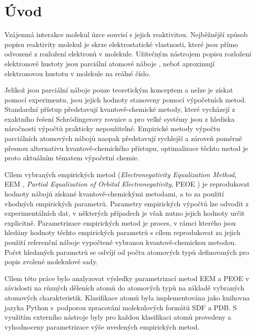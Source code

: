 \chapter{Úvod}
\setcounter{page}{1}
Vzájemná interakce molekul úzce souvisí s jejich reaktivitou.
Nejběžnější způsob popisu reaktivity molekul je skrze  elektrostatické vlastnosti, které jsou pří\-mo odvozené z rozložení elektronů v molekule. Užitečným nástrojem popisu rozložení elektronové hustoty jsou parciální atomové náboje \cite{Atkins}, neboť aproximují elektronovou hustotu v molekule na reálné číslo.

Jelikož jsou parciální náboje pouze teoretickým konceptem a nelze je získat pomocí experimentu, jsou jejich hodnoty stanoveny pomocí výpočetních metod. Standardní přístup představují kvantově-chemické metody, které vycházejí z exaktního řešení Schrödingerovy rovnice \cite{Volatron} a pro velké systémy jsou z hlediska náročnosti výpočtů prakticky nepoužitelné. Empirické metody výpočtu parciálních atomových nábojů naopak představují rychlejší a zároveň poměrně přesnou alternativu kvantově-chemické\-ho přístupu, optimalizace těchto metod je proto aktuálním tématem výpočetní chemie. 

Cílem vybraných empirických metod (\textit{Electronegativity Equalization Method}, EEM \cite{eem}, \textit{Partial Equalization of Orbital Electronegativity}, PEOE \cite{GM}) je reprodukovat hodnoty nábojů získané kvantově-chemickými metodami, a to za použití vhodných empirických parametrů. Parametry empirických výpočtů lze odvodit z experimentálních dat, v některých případech je však nutno jejich hodnoty určit explicitně. Parametrizace empirických metod je proces, v rámci kterého jsou hledány hodnoty těchto empirických parametrů s cílem reprodukovat za jejich použití referenční náboje vypočtené vybranou kvantově-chemickou metodou. Počet hledaných parametrů se odvíjí od počtu atomových typů definovaných pro popis zvolené molekulové sady. 

Cílem této práce bylo analyzovat výsledky parametrizací metod EEM a PEOE v závislosti na různých děleních atomů do atomových typů na základě vybraných atomových charakteristik. Klasifikace atomů byla implementována jako knihovna jazyka Python s~podporou zpracování molekulových formátů SDF a PDB. S využitím externího nástroje byly pro každou klasifikaci atomů provedeny a vyhodnoceny parametrizace výše uvedených empirických metod.


